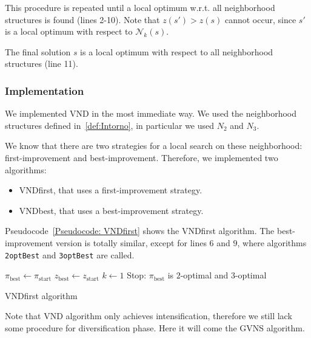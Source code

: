 This procedure is repeated until a local optimum w.r.t. all neighborhood structures is found (lines 2-10). Note that $z(s') > z(s)$ cannot occur, since $s'$ is a local optimum with respect to $\mathcal N_k(s)$.

The final solution $s$ is a local optimum with respect to all neighborhood structures (line 11).

\subsubsection{Implementation}

We implemented VND in the most immediate way. We used the neighborhood structures defined in~\ref{def:Intorno}, in particular we used ${N}_2$ and ${N}_3$.

We know that there are two strategies for a local search on these neighborhood: first-improvement and best-improvement. Therefore, we implemented two algorithms: 
\begin{itemize}
	\item  VNDfirst, that uses a first-improvement strategy.
	\item  VNDbest, that uses a best-improvement strategy.	
\end{itemize}

Pseudocode~\ref{Pseudocode: VNDfirst} shows the VNDfirst algorithm. The best-improvement version is totally similar, except for lines $6$ and $9$, where algorithms \texttt{2optBest} and \texttt{3optBest} are called.


\begin{algorithm}
$\pi_\mathrm{best} \gets \pi_\mathrm{start}$\;
$z_\mathrm{best} \gets z_\mathrm{start}$\;	
	$k\gets 1$\;
Stop: $\pi_\mathrm{best}$ is $2$-optimal and $3$-optimal\;
	\caption{VNDfirst algorithm}
	\label{Pseudocode: VNDfirst}
	
\end{algorithm}
Note that VND algorithm only achieves intensification, therefore we still lack some procedure for diversification phase. Here it will come the GVNS algorithm.


